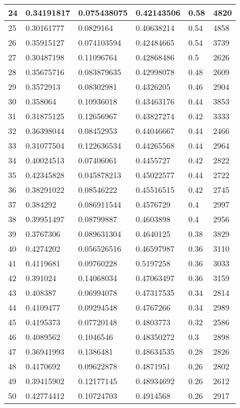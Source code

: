 \begin{longtable}{|l|l|l|l|l|l|}
24 & 0.34191817 & 0.075438075 & 0.42143506 & 0.58 & 4820 \\ \hline 
25 & 0.30161777 & 0.0829164 & 0.40638214 & 0.54 & 4858 \\ \hline 
26 & 0.35915127 & 0.074103594 & 0.42484665 & 0.54 & 3739 \\ \hline 
27 & 0.30487198 & 0.11096764 & 0.42868486 & 0.5 & 2626 \\ \hline 
28 & 0.35675716 & 0.083879635 & 0.42998078 & 0.48 & 2609 \\ \hline 
29 & 0.3572913 & 0.08302981 & 0.4326205 & 0.46 & 2904 \\ \hline 
30 & 0.358064 & 0.10936018 & 0.43463176 & 0.44 & 3853 \\ \hline 
31 & 0.31875125 & 0.12656967 & 0.43827274 & 0.42 & 3333 \\ \hline 
32 & 0.36398044 & 0.08452953 & 0.44046667 & 0.44 & 2466 \\ \hline 
33 & 0.31077504 & 0.122636534 & 0.44265568 & 0.44 & 2964 \\ \hline 
34 & 0.40024513 & 0.07406061 & 0.4455727 & 0.42 & 2822 \\ \hline 
35 & 0.42345828 & 0.045878213 & 0.45022577 & 0.44 & 2722 \\ \hline 
36 & 0.38291022 & 0.08546222 & 0.45516515 & 0.42 & 2745 \\ \hline 
37 & 0.384292 & 0.086911544 & 0.4576729 & 0.4 & 2997 \\ \hline 
38 & 0.39951497 & 0.08799887 & 0.4603898 & 0.4 & 2956 \\ \hline 
39 & 0.3767306 & 0.089631304 & 0.4640125 & 0.38 & 3829 \\ \hline 
40 & 0.4274202 & 0.056526516 & 0.46597987 & 0.36 & 3110 \\ \hline 
41 & 0.4119681 & 0.09760228 & 0.5197258 & 0.36 & 3033 \\ \hline 
42 & 0.391024 & 0.14068034 & 0.47063497 & 0.36 & 3159 \\ \hline 
43 & 0.408387 & 0.06994078 & 0.47317535 & 0.34 & 2814 \\ \hline 
44 & 0.4109477 & 0.09294548 & 0.4767266 & 0.34 & 2989 \\ \hline 
45 & 0.4195373 & 0.07720148 & 0.4803773 & 0.32 & 2586 \\ \hline 
46 & 0.4089562 & 0.1046546 & 0.48350272 & 0.3 & 2898 \\ \hline 
47 & 0.36941993 & 0.1386481 & 0.48634535 & 0.28 & 2826 \\ \hline 
48 & 0.4170692 & 0.09622878 & 0.4871951 & 0.26 & 2802 \\ \hline 
49 & 0.39415902 & 0.12177145 & 0.48934692 & 0.26 & 2612 \\ \hline 
50 & 0.42774412 & 0.10724703 & 0.4914568 & 0.26 & 2917 \\ \hline 
\end{longtable}